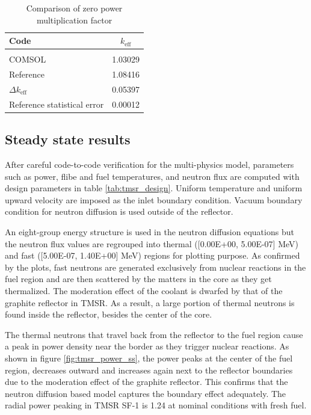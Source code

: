 \documentclass{elsarticle}
\newcommand{\keff}{{\ensuremath{k_{\mathrm{eff}}}} }
\begin{document}
\begin{table}
\centering
  \begin{tabular}{lc}
  \hline
        Code & \keff \\
        \hline\\
       COMSOL & 1.03029  \\
       Reference & 1.08416\\
       $\Delta$\keff & 0.05397\\
       Reference statistical error & 0.00012\\
       \hline
  \end{tabular}
  \caption{Comparison of zero power multiplication factor}
  \label{tab:keff}
\end{table}





\subsection{Steady state results}
After careful code-to-code verification for the multi-physics model, parameters such as power, flibe and fuel temperatures, and neutron flux are computed with design parameters in table \ref{tab:tmsr_design}. Uniform temperature and uniform upward velocity are imposed as the inlet boundary condition. Vacuum boundary condition for neutron diffusion is used outside of the reflector.  

An eight-group energy structure is used in the neutron diffusion equations but the neutron flux values are regrouped into thermal ([0.00E+00, 5.00E-07] MeV) and fast  ([5.00E-07, 1.40E+00] MeV) regions for plotting purpose. As confirmed by the plots, fast neutrons are generated exclusively from nuclear reactions in the fuel region and are then scattered by the matters in the core as they get thermalized. 
The moderation effect of the coolant is dwarfed by that of the graphite reflector in TMSR. As a result, a large portion of thermal neutrons is found inside the reflector, besides the center of the core.

The thermal neutrons that travel back from the reflector to the fuel region cause a peak in power density near the border as they trigger nuclear reactions. 
As shown in figure \ref{fig:tmsr_power_ss}, the power peaks at the center of the fuel region, decreases outward and increases again next to the reflector boundaries due to the moderation effect of the graphite reflector. This confirms that the neutron diffusion based model captures the boundary effect adequately. The radial power peaking in TMSR SF-1 is 1.24 at nominal conditions with fresh fuel.
\end{document}
